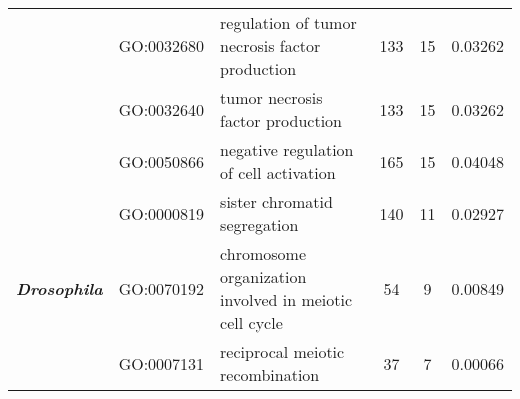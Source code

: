 \documentclass[../main.tex]{subfiles}
\begin{document}
\begin{landscape}
\begin{longtable}{@{}lllccr@{}}
		                                               & GO:0032680                         & regulation of tumor necrosis factor production                            & 133                                                                & 15                                                                   & 0.03262                                                                                  \\
		                                               & GO:0032640                         & tumor necrosis factor production                                          & 133                                                                & 15                                                                   & 0.03262                                                                                  \\
		                                               & GO:0050866                         & negative regulation of cell activation                                    & 165                                                                & 15                                                                   & 0.04048                                                                                  \\* \midrule
		\multirow{10}{*}{\textit{\textbf{Drosophila}}} & GO:0000819                         & sister chromatid segregation                                              & 140                                                                & 11                                                                   & 0.02927                                                                                  \\
		                                               & GO:0070192                         & chromosome organization involved in meiotic cell cycle                    & 54                                                                 & 9                                                                    & 0.00849                                                                                  \\
		                                               & GO:0007131                         & reciprocal meiotic recombination                                          & 37                                                                 & 7                                                                    & 0.00066                                                                                  \\

\end{longtable}
\end{landscape}
\end{document}
